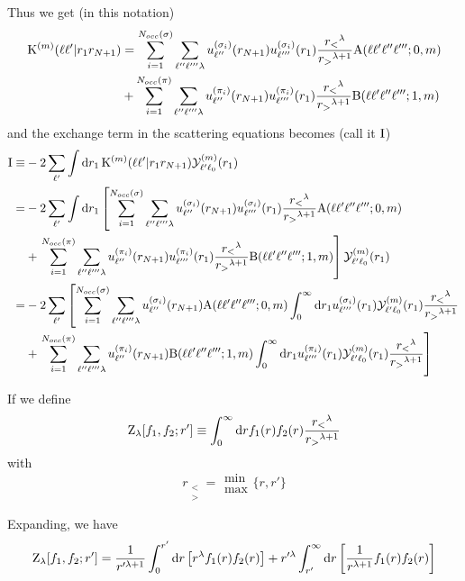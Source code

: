 \documentclass[aps,pra,groupedaddress,12pt,
               amsfonts,amssymb,
               preprint
    ]{revtex4}
\begin{document}
Thus we get (in this notation)
\begin{equation}
  \label{eq:KEXSPa}
  \begin{split}
  \mathrm{K}^{(m)}(\ell\ell'|r_1r_{N+1}) & = \sum_{i=1}^{N_{occ}(\sigma)}\sum_{\ell''\ell'''\lambda}
  u_{\ell''}^{(\sigma_i)}(r_{N+1})u_{\ell'''}^{(\sigma_i)}(r_1)\dfrac{r_<{}^\lambda}{r_>{}^{\lambda+1}}\mathrm{A}(\ell\ell'\ell''\ell''';0,m) \\
       & + \sum_{i=1}^{N_{occ}(\pi)}\sum_{\ell''\ell'''\lambda}
  u_{\ell''}^{(\pi_i)}(r_{N+1})u_{\ell'''}^{(\pi_i)}(r_1)\dfrac{r_<{}^\lambda}{r_>{}^{\lambda+1}}\mathrm{B}(\ell\ell'\ell''\ell''';1,m)
  \end{split}
\end{equation}
and the exchange term in the scattering equations becomes (call it $\mathrm{I}$)
\begin{equation}
  \label{eq:ET}
  \begin{split}
    \mathrm{I} \equiv & -2\sum_{\ell'}\int\mathrm{d} r_1\,\mathrm{K}^{(m)}(\ell\ell'|r_1r_{N+1})\mathcal{Y}_{\ell'\ell_0}^{(m)}(r_{1}) \\
      = & -2\sum_{\ell'}\int\mathrm{d} r_1\left[\sum_{i=1}^{N_{occ}(\sigma)}\sum_{\ell''\ell'''\lambda}
  u_{\ell''}^{(\sigma_i)}(r_{N+1})u_{\ell'''}^{(\sigma_i)}(r_1)\dfrac{r_<{}^\lambda}{r_>{}^{\lambda+1}}\mathrm{A}(\ell\ell'\ell''\ell''';0,m)\right. \\
       & + \left.\sum_{i=1}^{N_{occ}(\pi)}\sum_{\ell''\ell'''\lambda}
  u_{\ell''}^{(\pi_i)}(r_{N+1})u_{\ell'''}^{(\pi_i)}(r_1)\dfrac{r_<{}^\lambda}{r_>{}^{\lambda+1}}\mathrm{B}(\ell\ell'\ell''\ell''';1,m)\right]\mathcal{Y}_{\ell'\ell_0}^{(m)}(r_{1}) \\
      = & -2\sum_{\ell'}\left[\sum_{i=1}^{N_{occ}(\sigma)}\sum_{\ell''\ell'''\lambda}
  u_{\ell''}^{(\sigma_i)}(r_{N+1})\mathrm{A}(\ell\ell'\ell''\ell''';0,m)\int_0^{\infty}\mathrm{d} r_1u_{\ell'''}^{(\sigma_i)}(r_1)\mathcal{Y}_{\ell'\ell_0}^{(m)}(r_{1})\dfrac{r_<{}^\lambda}{r_>{}^{\lambda+1}}\right. \\
       & + \left.\sum_{i=1}^{N_{occ}(\pi)}\sum_{\ell''\ell'''\lambda}
  u_{\ell''}^{(\pi_i)}(r_{N+1})\mathrm{B}(\ell\ell'\ell''\ell''';1,m)\int_0^{\infty}\mathrm{d} r_1u_{\ell'''}^{(\pi_i)}(r_1)\mathcal{Y}_{\ell'\ell_0}^{(m)}(r_{1})\dfrac{r_<{}^\lambda}{r_>{}^{\lambda+1}}\right]
  \end{split}
\end{equation}

If we define
\begin{equation}
  \label{eq:Zlam}
  \mathrm{Z}_{\lambda}[f_1,f_2;r'] \equiv \int_0^{\infty}\mathrm{d}
  rf_1(r)f_2(r)\dfrac{r_<{}^\lambda}{r_>{}^{\lambda+1}} 
\end{equation}
with
\begin{equation*}
    r_{\substack{< \\ >}} = \substack{\min \\ \max}\big\{r,r'\big\}
\end{equation*}

Expanding, we have
\begin{equation}
  \label{eq:Zlama}
  \mathrm{Z}_{\lambda}[f_1,f_2;r'] = \dfrac{1}{r'^{\lambda+1}}\int_0^{r'}\mathrm{d}
  r\left[r^{\lambda}f_1(r)f_2(r)\right] + r'^{\lambda}\int_{r'}^{\infty}\mathrm{d}
  r\left[\dfrac{1}{r^{\lambda+1}}f_1(r)f_2(r)\right] 
\end{equation}
\end{document}
